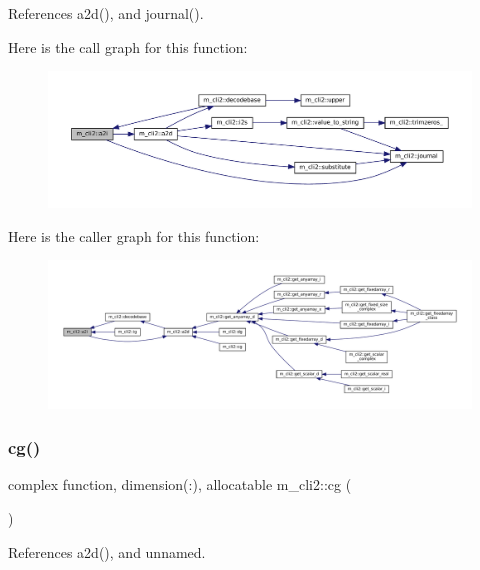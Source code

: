 References a2d(), and journal().

Here is the call graph for this function\+:\nopagebreak
\begin{figure}[H]
\begin{center}
\leavevmode
\includegraphics[width=350pt]{namespacem__cli2_a0be58233adafc0bf10dfe69300a05b9f_cgraph}
\end{center}
\end{figure}
Here is the caller graph for this function\+:\nopagebreak
\begin{figure}[H]
\begin{center}
\leavevmode
\includegraphics[width=350pt]{namespacem__cli2_a0be58233adafc0bf10dfe69300a05b9f_icgraph}
\end{center}
\end{figure}
\mbox{\label{namespacem__cli2_af45e2401f7c3c2309fe92882c1d5e521}} 
\subsubsection{\texorpdfstring{cg()}{cg()}}
{\footnotesize\ttfamily complex function, dimension(\+:), allocatable m\+\_\+cli2\+::cg (\begin{DoxyParamCaption}{ }\end{DoxyParamCaption})\hspace{0.3cm}{\ttfamily [private]}}



References a2d(), and unnamed.

